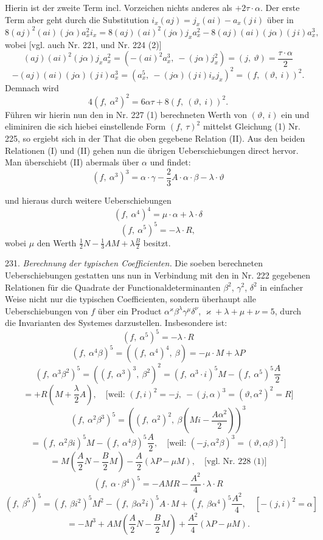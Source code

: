 \documentclass[11pt]{article}
\providecommand{\weberpage}[1]{}
\providecommand{\weq}[2]{\begin{equation}\tag{#1}#2\end{equation}}
\begin{document}
Hierin ist der zweite Term incl. Vorzeichen nichts anderes als $+2\tau \cdot \alpha$.
Der erste Term aber geht durch die Substitution $i_x(aj) = j_x(ai) - a_x(j\,i)$
über in
\weq{5}{8(aj)^2(ai)(j\alpha)a_x^2 i_x = 8(aj)(ai)^2(j\alpha)j_x a_x^2 - 8(aj)(ai)(j\alpha)(j\,i)a_x^3,}
wobei [vgl. auch Nr. 221, und Nr. 224 (2)]
\[
(aj)(ai)^2(j\alpha)j_x a_x^2 = \left(-(ai)^2 a_x^3,\ -(j\alpha)j_x^2\right) = (j,\ \vartheta) = \frac{\tau \cdot \alpha}{2}
\]
\[
-(aj)(ai)(j\alpha)(j\,i)a_x^3 = \left(a_x^5,\ -(j\alpha)(j\,i)i_x j_x\right)^2 = (f,\ (\vartheta,\ i))^2.
\]
Demnach wird
\[
4(f,\ \alpha^2)^2 = 6\alpha\tau + 8(f,\ (\vartheta,\ i))^2.
\]
Führen wir hierin nun den in Nr. 227 (1) berechneten Werth von
$(\vartheta,\ i)$ ein und eliminiren die sich hiebei einstellende Form $(f,\ \tau)^2$ mittelst
Gleichung (1) Nr. 225, so ergiebt sich in der That die oben gegebene
Relation (II). Aus den beiden Relationen (I) und (II) gehen
nun die übrigen Ueberschiebungen direct hervor. Man überschiebt (II)
abermals über $\alpha$ und findet:
\weq{III}{(f,\ \alpha^3)^3 = \alpha \cdot \gamma - \frac{2}{3}A \cdot \alpha \cdot \beta - \lambda \cdot \vartheta}


\weberpage{256}

und hieraus durch weitere Ueberschiebungen
\weq{IV}{(f,\ \alpha^4)^4 = \mu \cdot \alpha + \lambda \cdot \delta}
\weq{V}{(f,\ \alpha^5)^5 = -\lambda \cdot R,}
wobei $\mu$ den Werth $\frac{1}{2}N - \frac{1}{3}AM + \lambda\frac{B}{2}$ besitzt.

231. \textit{Berechnung der typischen Coefficienten.} Die soeben berechneten
Ueberschiebungen gestatten uns nun in Verbindung mit den in
Nr. 222 gegebenen Relationen für die Quadrate der Functionaldeterminanten
$\beta^2$, $\gamma^2$, $\delta^2$ in einfacher Weise nicht nur die typischen Coefficienten,
sondern überhaupt alle Ueberschiebungen von $f$ über ein Product
$\alpha^{\varkappa}\beta^{\lambda}\gamma^{\mu}\delta^{\nu}$, $\varkappa + \lambda + \mu + \nu = 5$, durch die Invarianten des
Systemes darzustellen. Insbesondere ist:
\[
(f,\ \alpha^5)^5 = -\lambda \cdot R
\]
\[
(f,\ \alpha^4\beta)^5 = \left((f,\ \alpha^4)^4,\ \beta\right) = -\mu \cdot M + \lambda P
\]
\[
(f,\ \alpha^3\beta^2)^5 = \left((f,\ \alpha^3)^3,\ \beta^2\right)^2 = (f,\ \alpha^3 \cdot i)^5 M - (f,\ \alpha^5)^5 \frac{A}{2}
\]
\[
{} = +R\left(M + \frac{\lambda}{2}A\right), \quad \text{[weil: } (f,i)^2 = -j,\ -(j,\alpha)^3 = (\vartheta,\alpha^2)^2 = R\text{]}
\]
\[
(f,\ \alpha^2\beta^3)^5 = \left((f,\ \alpha^2)^2,\ \beta\left(Mi - \frac{A\alpha^2}{2}\right)\right)^3
\]
\[
{} = (f,\ \alpha^2\beta i)^5 M - (f,\ \alpha^4\beta)^5 \frac{A}{2}, \quad \text{[weil: } (-j,\alpha^2\beta)^3 = (\vartheta,\alpha\beta)^2\text{]}
\]
\[
{} = M\left(\frac{A}{2}N - \frac{B}{2}M\right) - \frac{A}{2}(\lambda P - \mu M), \quad \text{[vgl. Nr. 228 (1)]}
\]
\[
(f,\ \alpha \cdot \beta^4)^5 = -AMR - \frac{A^2}{4} \cdot \lambda \cdot R
\]
\[
(f,\ \beta^5)^5 = (f,\ \beta i^2)^5 M^2 - (f,\ \beta\alpha^2 i)^5 A \cdot M + (f,\ \beta\alpha^4)^5 \frac{A^2}{4}, \quad [-(j,i)^2 = \alpha]
\]
\[
{} = -M^3 + AM\left(\frac{A}{2}N - \frac{B}{2}M\right) + \frac{A^2}{4}(\lambda P - \mu M).
\]
\end{document}
